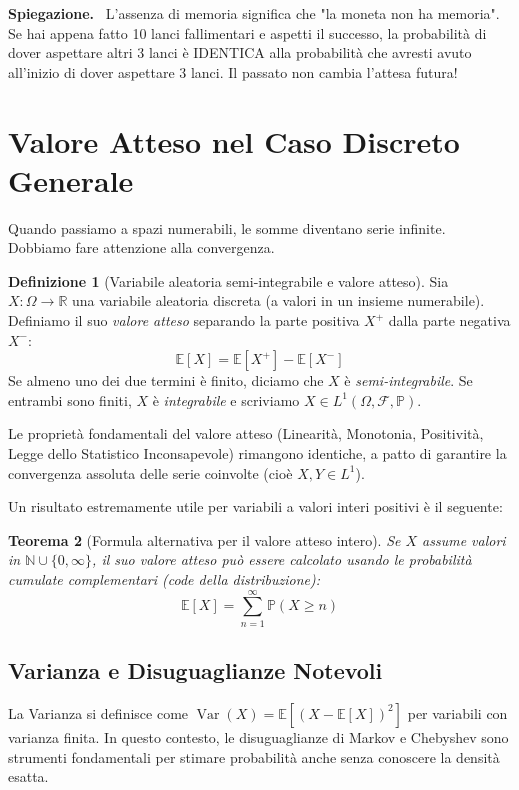 \documentclass[11pt, a4paper]{report}
\theoremstyle{plain}
\newtheorem{theorem}{Teorema}[chapter]
\theoremstyle{definition}
\newtheorem{definition}[theorem]{Definizione}
\theoremstyle{remark}
\newenvironment{spiegazione}[1][Spiegazione]
{\begin{mdframed}[backgroundcolor=green!5, linecolor=green!50, linewidth=2pt, topline=false, rightline=false, bottomline=false]
\textbf{\textsf{#1.}}\ }
{\end{mdframed}}
\newcommand{\PP}{\mathbb{P}}
\newcommand{\E}{\mathbb{E}}
\newcommand{\F}{\mathcal{F}}
\newcommand{\R}{\mathbb{R}}
\newcommand{\N}{\mathbb{N}}
\newcommand{\1}{\mathbf{1}}
\begin{document}
\begin{spiegazione}
    L'assenza di memoria significa che "la moneta non ha memoria". Se hai appena fatto 10 lanci fallimentari e aspetti il successo, la probabilità di dover aspettare altri 3 lanci è IDENTICA alla probabilità che avresti avuto all'inizio di dover aspettare 3 lanci. Il passato non cambia l'attesa futura!
\end{spiegazione}

\section{Valore Atteso nel Caso Discreto Generale}

Quando passiamo a spazi numerabili, le somme diventano serie infinite. Dobbiamo fare attenzione alla convergenza. 

\begin{definition}[Variabile aleatoria semi-integrabile e valore atteso]
Sia $X : \Omega \to \R$ una variabile aleatoria discreta (a valori in un insieme numerabile). Definiamo il suo \emph{valore atteso} separando la parte positiva $X^+$ dalla parte negativa $X^-$:
\[ \E[X] = \E[X^+] - \E[X^-] \]
Se almeno uno dei due termini è finito, diciamo che $X$ è \emph{semi-integrabile}. Se entrambi sono finiti, $X$ è \emph{integrabile} e scriviamo $X \in L^1(\Omega, \F, \PP)$.
\end{definition}

Le proprietà fondamentali del valore atteso (Linearità, Monotonia, Positività, Legge dello Statistico Inconsapevole) rimangono identiche, a patto di garantire la convergenza assoluta delle serie coinvolte (cioè $X, Y \in L^1$).

Un risultato estremamente utile per variabili a valori interi positivi è il seguente:
\begin{theorem}[Formula alternativa per il valore atteso intero]
Se $X$ assume valori in $\N \cup \{0, \infty\}$, il suo valore atteso può essere calcolato usando le probabilità cumulate complementari (code della distribuzione):
\[ \E[X] = \sum_{n=1}^\infty \PP(X \ge n) \]
\end{theorem}

\subsection{Varianza e Disuguaglianze Notevoli}
La Varianza si definisce come $\operatorname{Var}(X) = \E[(X-\E[X])^2]$ per variabili con varianza finita. In questo contesto, le disuguaglianze di Markov e Chebyshev sono strumenti fondamentali per stimare probabilità anche senza conoscere la densità esatta.
\end{document}
